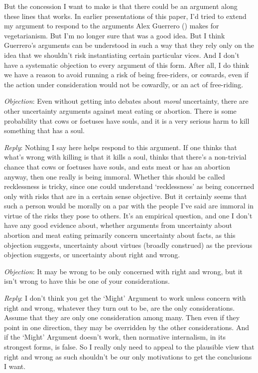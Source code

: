 \documentclass[
  11pt,
  letterpaper,
  DIV=11,
  numbers=noendperiod,
  twoside]{scrartcl}
\begin{document}
But the concession I want to make is that there could be an argument
along these lines that works. In earlier presentations of this paper,
I'd tried to extend my argument to respond to the arguments Alex
Guerrero () makes for vegetarianism.
But I'm no longer sure that was a good idea. But I think Guerrero's
arguments can be understood in such a way that they rely only on the
idea that we shouldn't risk instantiating certain particular vices. And
I don't have a systematic objection to every argument of this form.
After all, I do think we have a reason to avoid running a risk of being
free-riders, or cowards, even if the action under consideration would
not be cowardly, or an act of free-riding.

\emph{Objection}: Even without getting into debates about \emph{moral}
uncertainty, there are other uncertainty arguments against meat eating
or abortion. There is some probability that cows or foetuses have souls,
and it is a very serious harm to kill something that has a soul.

\emph{Reply}: Nothing I say here helps respond to this argument. If one
thinks that what's wrong with killing is that it kills a soul, thinks
that there's a non-trivial chance that cows or foetuses have souls, and
eats meat or has an abortion anyway, then one really is being immoral.
Whether this should be called recklessness is tricky, since one could
understand `recklessness' as being concerned only with risks that are in
a certain sense objective. But it certainly seems that such a person
would be morally on a par with the people I've said are immoral in
virtue of the risks they pose to others. It's an empirical question, and
one I don't have any good evidence about, whether arguments from
uncertainty about abortion and meat eating primarily concern uncertainty
about facts, as this objection suggests, uncertainty about virtues
(broadly construed) as the previous objection suggests, or uncertainty
about right and wrong.

\emph{Objection}: It may be wrong to be only concerned with right and
wrong, but it isn't wrong to have this be one of your considerations.

\emph{Reply}: I don't think you get the `Might' Argument to work unless
concern with right and wrong, whatever they turn out to be, are the only
considerations. Assume that they are only one consideration among many.
Then even if they point in one direction, they may be overridden by the
other considerations. And if the `Might' Argument doesn't work, then
normative internalism, in its strongest forms, is false. So I really
only need to appeal to the plausible view that right and wrong as such
shouldn't be our only motivations to get the conclusions I want.
\end{document}
